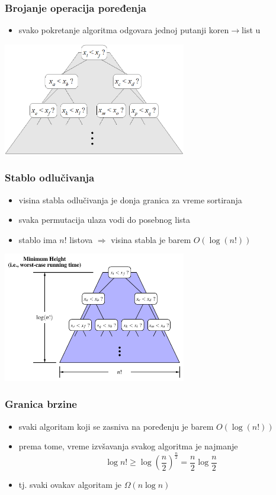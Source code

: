 \documentclass[compress,aspectratio=169]{beamer}
\begin{document}
\begin{frame}[fragile]
  \frametitle{Brojanje operacija poređenja}
  \begin{itemize}
    \item svako pokretanje algoritma odgovara jednoj putanji koren$\rightarrow$list u 
  \end{itemize}
  \begin{center}
    \includegraphics[width=8cm]{asp-12-pic29.png}
  \end{center}
\end{frame}

\begin{frame}[fragile]
  \frametitle{Stablo odlučivanja}
  \begin{itemize}
    \item visina stabla odlučivanja je donja granica za vreme sortiranja
    \item svaka permutacija ulaza vodi do posebnog lista
    \item stablo ima $n!$ listova $\Rightarrow$ visina stabla je barem $O(\log(n!))$
  \end{itemize}
  \begin{center}
    \includegraphics[width=8cm]{asp-12-pic30.pdf}
  \end{center}
\end{frame}

\begin{frame}[fragile]
  \frametitle{Granica brzine}
  \begin{itemize}
    \item svaki algoritam koji se zasniva na poređenju je barem $O(\log(n!))$
    \item prema tome, vreme izvšavanja svakog algoritma je najmanje
    $$\log n! \geq \log \left(\frac{n}{2}\right)^{\frac{n}{2}} = \frac{n}{2}\log\frac{n}{2}$$
    \item tj. svaki ovakav algoritam je $\Omega(n\log n)$
  \end{itemize}
\end{frame}
\end{document}
